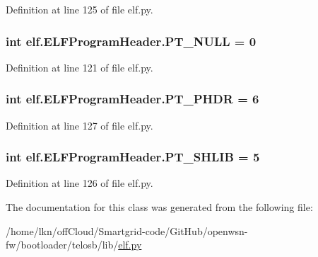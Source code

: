 Definition at line 125 of file elf.\+py.

\subsubsection[{\texorpdfstring{P\+T\+\_\+\+N\+U\+LL}{PT_NULL}}]{\setlength{\rightskip}{0pt plus 5cm}int elf.\+E\+L\+F\+Program\+Header.\+P\+T\+\_\+\+N\+U\+LL = 0\hspace{0.3cm}{\ttfamily [static]}}\hypertarget{clasself_1_1_e_l_f_program_header_ad6e1767d66ead863f5787dd6a0a6ae18}{}\label{clasself_1_1_e_l_f_program_header_ad6e1767d66ead863f5787dd6a0a6ae18}


Definition at line 121 of file elf.\+py.

\subsubsection[{\texorpdfstring{P\+T\+\_\+\+P\+H\+DR}{PT_PHDR}}]{\setlength{\rightskip}{0pt plus 5cm}int elf.\+E\+L\+F\+Program\+Header.\+P\+T\+\_\+\+P\+H\+DR = 6\hspace{0.3cm}{\ttfamily [static]}}\hypertarget{clasself_1_1_e_l_f_program_header_a0d8b894ae2168e47ed4d9aaae3e7a018}{}\label{clasself_1_1_e_l_f_program_header_a0d8b894ae2168e47ed4d9aaae3e7a018}


Definition at line 127 of file elf.\+py.

\subsubsection[{\texorpdfstring{P\+T\+\_\+\+S\+H\+L\+IB}{PT_SHLIB}}]{\setlength{\rightskip}{0pt plus 5cm}int elf.\+E\+L\+F\+Program\+Header.\+P\+T\+\_\+\+S\+H\+L\+IB = 5\hspace{0.3cm}{\ttfamily [static]}}\hypertarget{clasself_1_1_e_l_f_program_header_a5762e86e5efc83d5c128266d4061d882}{}\label{clasself_1_1_e_l_f_program_header_a5762e86e5efc83d5c128266d4061d882}


Definition at line 126 of file elf.\+py.



The documentation for this class was generated from the following file\+:\begin{DoxyCompactItemize}
\item 
/home/lkn/off\+Cloud/\+Smartgrid-\/code/\+Git\+Hub/openwsn-\/fw/bootloader/telosb/lib/\hyperlink{elf_8py}{elf.\+py}\end{DoxyCompactItemize}
